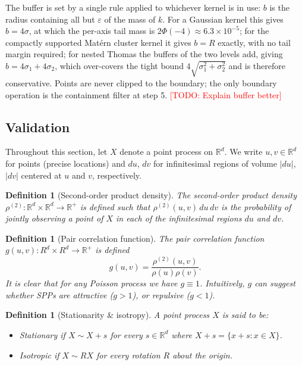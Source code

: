 \documentclass[11pt,letterpaper]{article}
\newcommand{\R}{\mathbb{R}}
\newcommand{\1}{\mathds{1}}
\newcommand{\todo}[1]{\textcolor{red}{[TODO: #1]}}
\newcommand{\fix}[1]{\textcolor{blue}{[FIX: #1]}}
\newcommand{\todo}[1]{}\newcommand{\fix}[1]{}
\theoremstyle{plain}
\theoremstyle{definitioncolon}
\newtheorem{definition}[theorem]{Definition}
\begin{document}
The buffer is set by a single rule applied to whichever kernel is in use: $b$ is
the radius containing all but $\varepsilon$ of the mass of $k$. For a Gaussian
kernel this gives $b = 4\sigma$, at which the per-axis tail mass is
$2\Phi(-4) \approx 6.3 \times 10^{-5}$; for the compactly supported Mat\'ern
cluster kernel it gives $b = R$ exactly, with no tail margin required; for nested
Thomas the buffers of the two levels add, giving $b = 4\sigma_1 + 4\sigma_2$,
which over-covers the tight bound $4\sqrt{\sigma_1^2 + \sigma_2^2}$ and is
therefore conservative. Points are never clipped to the boundary; the only
boundary operation is the containment filter at step 5.
\todo{Explain buffer better}

\subsection{Validation}
\label{ssec:verification}

Throughout this section, let $X$ denote a point process on $\R^d$. We write
$u, v \in \R^d$ for points (precise locations) and $du$, $dv$ for infinitesimal
regions of volume $|du|$, $|dv|$ centered at $u$ and $v$, respectively.

    \begin{definition}[Second-order product density]
    \label{def:rho2}
        The second-order product density
        $\rho^{(2)}: \R^d \times \R^d \rightarrow \R^+$
        is defined such that $\rho^{(2)}(u, v)\,du\,dv$ is the probability of
        jointly observing a point of $X$ in each of the infinitesimal regions
        $du$ and $dv$.
    \end{definition}

    \begin{definition}[Pair correlation function]
    \label{def:pcf}
        The pair correlation function $g(u, v): R^d \times R^d \rightarrow \R^+$
        is defined
        \[
        g(u, v) = \frac{\rho^{(2)}(u, v)}{\rho(u)\rho(v)}.
        \]
    It is clear that for any Poisson process we have $g \equiv 1$. Intuitively,
    $g$ can suggest whether SPPs are attractive ($g > 1$), or repulsive
    ($g < 1$).
    \end{definition}

    \begin{definition}[Stationarity \& isotropy]
    \label{def:stat-iso}
        A point process $X$ is said to be:
            \begin{itemize}
                \item \emph{Stationary} if $X \sim X + s$ for every
                $s \in \R^d$ where $X + s = \{x + s: x \in X\}$.
                \item \emph{Isotropic} if $X \sim RX$ for every rotation $R$
                about the origin.
            \end{itemize}
    \end{definition}
\end{document}
